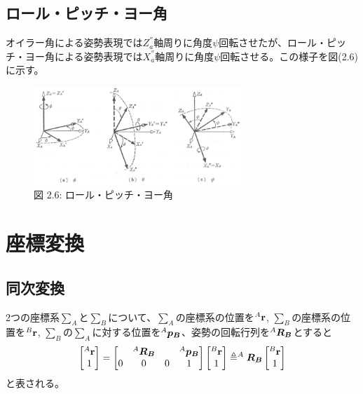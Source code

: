 \documentclass{article}
\begin{document}
\subsection{ロール・ピッチ・ヨー角}

オイラー角による姿勢表現では\(Z_a^{''}\)軸周りに角度\(\psi\)回転させたが、ロール・ピッチ・ヨー角による姿勢表現では\(X_a^{''}\)軸周りに角度\(\psi\)回転させる。この様子を図(2.6)に示す。

\begin{figure}[H]
    \centering
    \includegraphics[width=0.7\textwidth]{images/2_6.jpg}
    \caption{図 2.6: ロール・ピッチ・ヨー角}
    \label{fig:2.6}
\end{figure}


\section{座標変換}
\subsection{同次変換}
2つの座標系\(\sum_A\)と\(\sum_B\)について、\(\sum_A\)の座標系の位置を\(^{A} \vb{r}\), \(\sum_B\)の座標系の位置を\(^{B} \vb{r}\), \(\sum_B\)の\(\sum_A\)に対する位置を\(^{A}\vb*{p_B}\)、姿勢の回転行列を\(^{A}\vb*{R_B}\)とすると
\begin{equation}
    \begin{bmatrix}
        ^{A} \vb{r} \\
	1
    \end{bmatrix}
=
    \begin{bmatrix}
       & ^{A}\vb*{R_B} & & ^{A}\vb*{p_B}  \\
	0 & 0 & 0 & 1
    \end{bmatrix}
    \begin{bmatrix}
        ^{B} \vb{r} \\
	1
    \end{bmatrix}
    \triangleq
    ^{A}\vb*{R_B}
    \begin{bmatrix}
        ^{B} \vb{r} \\
	1
    \end{bmatrix}
\end{equation}
と表される。
\end{document}
